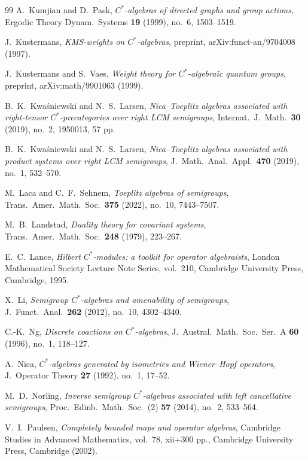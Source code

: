\documentclass[11pt,final]{amsart}
\numberwithin{equation}{section}
\theoremstyle{plain}
\theoremstyle{definition}
\theoremstyle{remark}
\begin{document}
\begin{thebibliography}{99}
A.\ Kumjian and D.\ Pask,
\textit{$C^*$-algebras of directed graphs and group actions},
Ergodic Theory Dynam.\ Systems \textbf{19} (1999), no.\ 6, 1503--1519.

J.\ Kustermans,
\textit{KMS-weights on $C^*$-algebras},
preprint, arXiv:funct-an/9704008 (1997).

J.\ Kustermans and S.\ Vaes,
\textit{Weight theory for $C^*$-algebraic quantum groups},
preprint, arXiv:math/9901063 (1999).

B.\ K.\ Kwa\'{s}niewski and N.\ S.\ Larsen,
\textit{Nica--Toeplitz algebras associated with right-tensor $C^*$-precategories
over right LCM semigroups},
Internat.\ J.\ Math.\ \textbf{30} (2019), no.\ 2, 1950013, 57 pp.

B.\ K.\ Kwa\'{s}niewski and N.\ S.\ Larsen,
\textit{Nica--Toeplitz algebras associated with product systems over right
LCM semigroups},
J.\ Math.\ Anal.\ Appl.\ \textbf{470} (2019), no.\ 1, 532--570.

M.\ Laca and C.\ F.\ Sehnem,
\textit{Toeplitz algebras of semigroups},
Trans.\ Amer.\ Math.\ Soc.\ \textbf{375} (2022), no.\ 10, 7443--7507.

M.\ B.\ Landstad,
\textit{Duality theory for covariant systems},
Trans.\ Amer.\ Math.\ Soc.\ \textbf{248} (1979), 223--267.

E.\ C.\ Lance,
\textit{Hilbert $C^*$-modules: a toolkit for operator algebraists},
London Mathematical Society Lecture Note Series, vol.\ 210,
Cambridge University Press, Cambridge, 1995.

X.\ Li,
\textit{Semigroup $C^*$-algebras and amenability of semigroups},
J.\ Funct.\ Anal.\ \textbf{262} (2012), no.\ 10, 4302--4340.

C.-K.\ Ng,
\textit{Discrete coactions on $C^*$-algebras},
J.\ Austral.\ Math.\ Soc.\ Ser.\ A \textbf{60} (1996), no.\ 1, 118--127.

A.\ Nica,
\textit{$C^*$-algebras generated by isometries and Wiener--Hopf operators},
J.\ Operator Theory \textbf{27} (1992), no.\ 1, 17--52.

M.\ D.\ Norling,
\textit{Inverse semigroup $C^*$-algebras associated with left cancellative semigroups},
Proc.\ Edinb.\ Math.\ Soc.\ (2) \textbf{57} (2014), no.\ 2, 533--564.

V.\ I.\ Paulsen,
\textit{Completely bounded maps and operator algebras},
Cambridge Studies in Advanced Mathematics, vol.\ 78, xii+300 pp.,
Cambridge University Press, Cambridge (2002).


\end{thebibliography}
\end{document}
